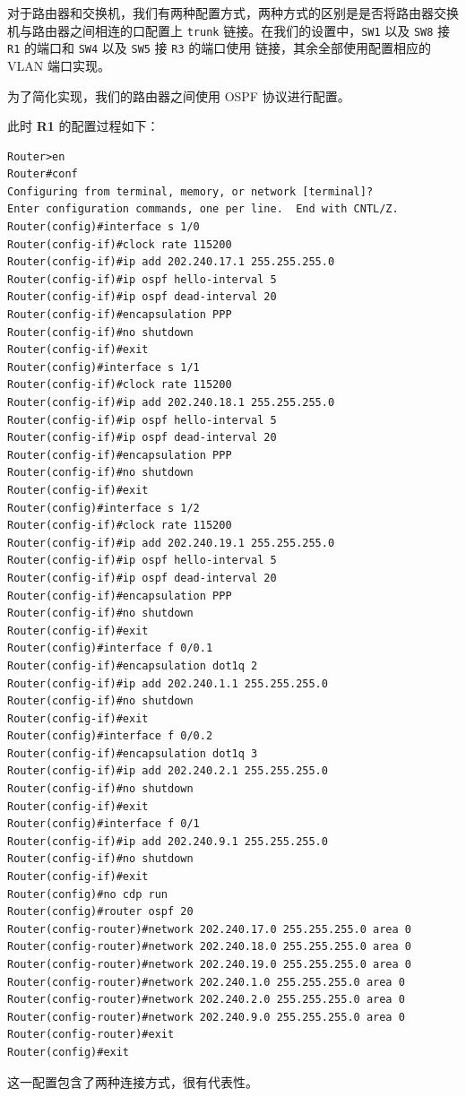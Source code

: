 \documentclass[black,normal,cn]{elegantnote}
\begin{document}
对于路由器和交换机，我们有两种配置方式，两种方式的区别是是否将路由器交换机与路由器之间相连的口配置上 \texttt{trunk} 链接。在我们的设置中，\texttt{SW1} 以及 \texttt{SW8} 接 \texttt{R1} 的端口和 \texttt{SW4} 以及 \texttt{SW5} 接 \texttt{R3} 的端口使用  链接，其余全部使用配置相应的 VLAN 端口实现。

为了简化实现，我们的路由器之间使用 OSPF 协议进行配置。

此时 \textbf{R1} 的配置过程如下：
\begin{lstlisting}
Router>en
Router#conf
Configuring from terminal, memory, or network [terminal]?
Enter configuration commands, one per line.  End with CNTL/Z.
Router(config)#interface s 1/0
Router(config-if)#clock rate 115200
Router(config-if)#ip add 202.240.17.1 255.255.255.0
Router(config-if)#ip ospf hello-interval 5
Router(config-if)#ip ospf dead-interval 20
Router(config-if)#encapsulation PPP
Router(config-if)#no shutdown
Router(config-if)#exit
Router(config)#interface s 1/1
Router(config-if)#clock rate 115200
Router(config-if)#ip add 202.240.18.1 255.255.255.0
Router(config-if)#ip ospf hello-interval 5
Router(config-if)#ip ospf dead-interval 20
Router(config-if)#encapsulation PPP
Router(config-if)#no shutdown
Router(config-if)#exit
Router(config)#interface s 1/2
Router(config-if)#clock rate 115200
Router(config-if)#ip add 202.240.19.1 255.255.255.0
Router(config-if)#ip ospf hello-interval 5
Router(config-if)#ip ospf dead-interval 20
Router(config-if)#encapsulation PPP
Router(config-if)#no shutdown
Router(config-if)#exit
Router(config)#interface f 0/0.1
Router(config-if)#encapsulation dot1q 2
Router(config-if)#ip add 202.240.1.1 255.255.255.0
Router(config-if)#no shutdown
Router(config-if)#exit
Router(config)#interface f 0/0.2
Router(config-if)#encapsulation dot1q 3
Router(config-if)#ip add 202.240.2.1 255.255.255.0
Router(config-if)#no shutdown
Router(config-if)#exit
Router(config)#interface f 0/1
Router(config-if)#ip add 202.240.9.1 255.255.255.0
Router(config-if)#no shutdown
Router(config-if)#exit
Router(config)#no cdp run
Router(config)#router ospf 20
Router(config-router)#network 202.240.17.0 255.255.255.0 area 0
Router(config-router)#network 202.240.18.0 255.255.255.0 area 0
Router(config-router)#network 202.240.19.0 255.255.255.0 area 0
Router(config-router)#network 202.240.1.0 255.255.255.0 area 0
Router(config-router)#network 202.240.2.0 255.255.255.0 area 0
Router(config-router)#network 202.240.9.0 255.255.255.0 area 0
Router(config-router)#exit
Router(config)#exit
\end{lstlisting}
这一配置包含了两种连接方式，很有代表性。
\end{document}
